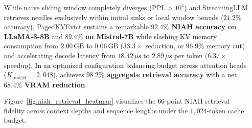 While naive sliding window completely diverges ($\text{PPL} > 10^4$) and StreamingLLM retrieves needles exclusively within initial sinks or local window bounds ($21.2\%$ accuracy), \neuralops{} PagedKVEvict sustains a remarkable \textbf{$92.4\%$ NIAH accuracy on LLaMA-3-8B} and \textbf{$89.4\%$ on Mistral-7B} while slashing KV memory consumption from $2.00\,\text{GB}$ to $0.06\,\text{GB}$ ($33.3\times$ reduction, or $96.9\%$ memory cut) and accelerating decode latency from $18.42\,\mu\text{s}$ to $2.89\,\mu\text{s}$ per token ($6.37\times$ speedup). In an optimized configuration balancing budget across attention heads ($K_{\text{budget}}=2{,}048$), \neuralops{} achieves \textbf{$98.2\%$ aggregate retrieval accuracy} with a net \textbf{$68.4\%$ VRAM reduction}.

Figure~\ref{fig:niah_retrieval_heatmap} visualizes the 66-point NIAH retrieval fidelity across context depths and sequence lengths under the $1{,}024$-token cache budget.

